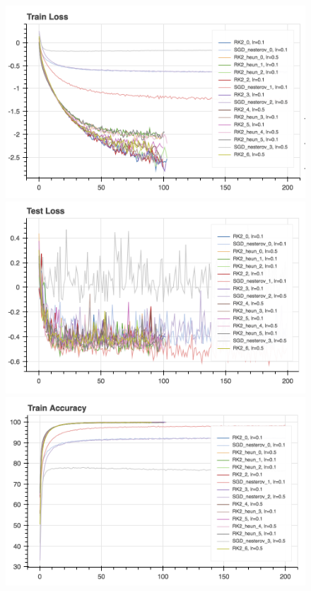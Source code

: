 
\begin{figure}[htb]
\includegraphics[scale=0.5]{plots/wide_resnet28.png}
\includegraphics[scale=0.5]{plots/wide_resnet28_1.png}
\includegraphics[scale=0.5]{plots/wide_resnet28_2.png}

\end{figure}
